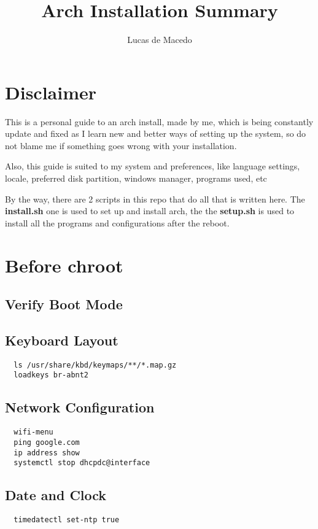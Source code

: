 \documentclass{article}
\title{Arch Installation Summary}
\author{Lucas de Macedo}
\begin{document}
\maketitle
\section{Disclaimer}
This is a personal guide to an arch install, made by me, which is being
constantly update and fixed as I learn new and better ways of setting up the
system, so do not blame me if something goes wrong with your installation.

Also, this guide is suited to my system and preferences, like language settings,
locale, preferred disk partition, windows manager, programs used, etc

By the way, there are 2 scripts in this repo that do all that is written here.
The \textbf{install.sh} one is used to set up and install arch, the the \textbf{setup.sh} is used
to install all the programs and configurations after the reboot.

\section{Before chroot}

\subsection{Verify Boot Mode}

\subsection{Keyboard Layout}
\begin{lstlisting}
  ls /usr/share/kbd/keymaps/**/*.map.gz
  loadkeys br-abnt2
\end{lstlisting}

\subsection{Network Configuration}
\begin{lstlisting}
  wifi-menu
  ping google.com
  ip address show
  systemctl stop dhcpdc@interface
\end{lstlisting}

\subsection{Date and Clock}
\begin{lstlisting}
  timedatectl set-ntp true
\end{lstlisting}
\end{document}
